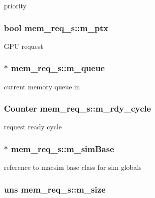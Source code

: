 \label{structmem__req__s_af7a1252bce4c150639539ba1551a3d33}
priority \hypertarget{structmem__req__s_a5f13d6f19dd50e8cc25ef9a795842007}{
\subsubsection[{m\_\-ptx}]{\setlength{\rightskip}{0pt plus 5cm}bool {\bf mem\_\-req\_\-s::m\_\-ptx}}}
\label{structmem__req__s_a5f13d6f19dd50e8cc25ef9a795842007}
GPU request \hypertarget{structmem__req__s_a01bfbc2d9326cadcb66c356740d10eb9}{
\subsubsection[{m\_\-queue}]{$\ast$ {\bf mem\_\-req\_\-s::m\_\-queue}}}
\label{structmem__req__s_a01bfbc2d9326cadcb66c356740d10eb9}
current memory queue in \hypertarget{structmem__req__s_a61a80fc35da503e4334d0dc79e2c3ff5}{
\subsubsection[{m\_\-rdy\_\-cycle}]{\setlength{\rightskip}{0pt plus 5cm}Counter {\bf mem\_\-req\_\-s::m\_\-rdy\_\-cycle}}}
\label{structmem__req__s_a61a80fc35da503e4334d0dc79e2c3ff5}
request ready cycle \hypertarget{structmem__req__s_a7477749204e08ce0a7aa41607a23d74f}{
\subsubsection[{m\_\-simBase}]{$\ast$ {\bf mem\_\-req\_\-s::m\_\-simBase}}}
\label{structmem__req__s_a7477749204e08ce0a7aa41607a23d74f}
reference to macsim base class for sim globals \hypertarget{structmem__req__s_a4d0488370174c8f3b7200cc4658c9d32}{
\subsubsection[{m\_\-size}]{\setlength{\rightskip}{0pt plus 5cm}uns {\bf mem\_\-req\_\-s::m\_\-size}}}
